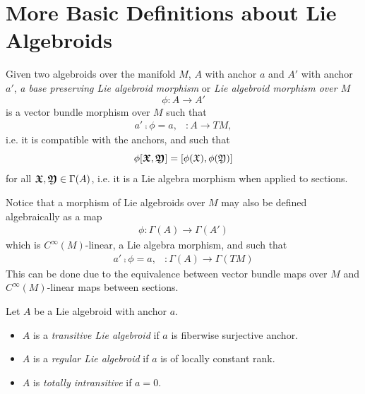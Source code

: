 \section{More Basic Definitions about Lie Algebroids}
\begin{definition}  \label{defnMorph}
Given two algebroids over the manifold $M$, $A$ with anchor $a$ and $A'$ with anchor $a'$, \emph{a base preserving Lie algebroid morphism} or \emph{Lie algebroid morphism over $M$} 
\[\phi: A \to A'\]
is a vector bundle morphism over $M$ such that 
\begin{align}
    a' \comp \phi = a, & : A \to TM,
\end{align}
i.e. it is compatible with the anchors, and such that 
\[\phi[\sect{\oid X}, \sect{\oid Y}] = [\phi(\oid X), \phi(\oid Y)]\] 
for all $\bm{\mathfrak{X}}, \bm{\mathfrak{Y}} \in \Gamma(A)$, i.e. it is a Lie algebra morphism when applied to sections. 
\end{definition}

\begin{remark}
Notice that a morphism of Lie algebroids over $M$ may also be defined algebraically as a map
\begin{align*}
    \phi: \Gamma(A) \to \Gamma(A')
\end{align*}
which is $C^\infty(M)$-linear, a Lie algebra morphism, and such that
\begin{align*}
    a' \comp \phi = a, & :\Gamma(A) \to \Gamma(TM)
\end{align*}
This can be done due to the equivalence between vector bundle maps over $M$ and $C^\infty(M)$-linear maps between sections.
\end{remark}

\begin{definition}
    Let $A$ be a Lie algebroid with anchor $a$.
    
    \begin{itemize}
    
    \item $A$ is a \emph{transitive Lie algebroid} if $a$ is fiberwise surjective anchor.
    
    \item $A$ is a \emph{regular Lie algebroid} if $a$ is of locally constant rank.
    
    \item $A$ is \emph{totally intransitive} if $a = 0$.
    
    \end{itemize}
    
\end{definition}

